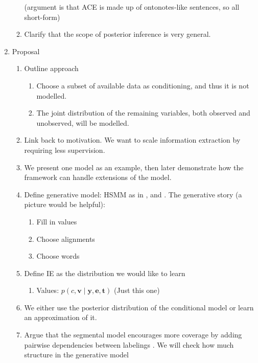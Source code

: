\documentclass[11pt]{article}
\newcommand{\be}{\mathbf{e}}
\newcommand{\br}{\mathbf{r}}
\newcommand{\bt}{\mathbf{t}}
\newcommand{\bv}{\mathbf{v}}
\newcommand{\by}{\mathbf{y}}
\begin{document}
\begin{enumerate}
\begin{enumerate}
        (argument is that ACE is made up of ontonotes-like sentences, so all short-form)
    \item Clarify that the scope of posterior inference is very general.
    \end{enumerate}
\item Proposal
    \begin{enumerate}
    \item Outline approach
        \begin{enumerate}
        \item Choose a subset of available data as conditioning,
            and thus it is not modelled.
        \item The joint distribution of the remaining variables,
            both observed and unobserved, will be modelled.
        \end{enumerate}
    \item Link back to motivation. We want to scale information extraction
        by requiring less supervision.
    \item We present one model as an example, then later demonstrate how the framework
        can handle extensions of the model.
    \item Define generative model: HSMM as in \citep{liang2009semalign},
        and \citep{wiseman2018template}.
        The generative story (a picture would be helpful):
        \begin{enumerate}
        \item Fill in values
        \item Choose alignments
        \item Choose words
        \end{enumerate}
    \item Define IE as the distribution we would like to learn
        \begin{enumerate}
        \item Values: $p(c,\bv\mid\by,\be,\bt)$ (Just this one)
        \end{enumerate}
    \item We either use the posterior distribution of the conditional model
        or learn an approximation of it.
    \item Argue that the segmental model encourages more coverage
        by adding pairwise dependencies between labelings \citep{liang2009semalign}.
        We will check how much structure in the generative model

\end{enumerate}
\end{enumerate}
\end{document}
